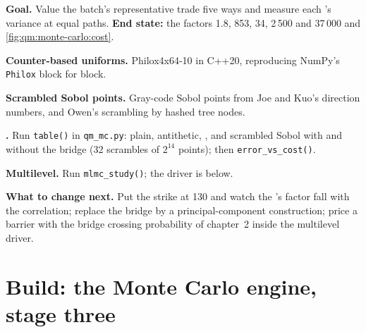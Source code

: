 \begin{tutorial}
\textbf{Goal.} Value the batch's representative trade five ways and measure each 's variance at equal paths. \textbf{End state:} the factors 1.8, 853, 34, 2\,500 and 37\,000 and
\cref{fig:qm:monte-carlo:cost}.
\begin{tutsteps}
\item \textbf{Counter-based uniforms.} Philox4x64-10 in C++20, reproducing NumPy's \texttt{Philox} block for block.
\label{lst:qm:monte-carlo:philox}
\item \textbf{Scrambled Sobol points.} Gray-code Sobol points from Joe and Kuo's direction numbers, and Owen's scrambling by hashed tree nodes.
\label{lst:qm:monte-carlo:sobol}
\item \textbf{.} Run \texttt{table()} in \texttt{qm\_mc.py}: plain, antithetic, , and scrambled Sobol with and without the bridge (32 scrambles of $2^{14}$ points); then
\texttt{error\_vs\_cost()}.
\item \textbf{Multilevel.} Run \texttt{mlmc\_study()}; the driver is below.
\label{lst:qm:monte-carlo:mlmc}
\end{tutsteps}
\textbf{What to change next.} Put the strike at 130 and watch the 's factor fall with the correlation; replace the bridge by a principal-component construction; price a barrier with
the bridge crossing probability of chapter~2 inside the multilevel driver.
\end{tutorial}

\section{Build: the Monte Carlo engine, stage three}\label{bld:qm:monte-carlo:mcengine}

